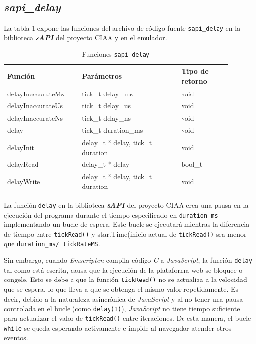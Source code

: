 \subsection{\textit{\textbf{sapi\_delay}}}

La tabla \ref{tab:sapiDelay} expone las funciones del archivo de código fuente \texttt{sapi\_delay} en la biblioteca \textit{\textbf{sAPI}} del proyecto CIAA y en el emulador.

\begin{table}[h]
	\centering
	\caption[Funciones \texttt{sapi\_delay}]{Funciones \texttt{sapi\_delay}}
	\begin{tabular}{p{0.30\linewidth} p{0.40\linewidth}  p{0.20\linewidth}}    
		\toprule
		\textbf{Función} 	 & \textbf{Parámetros} 		& \textbf{Tipo de retorno}  \\
		\midrule
		delayInaccurateMs & tick\_t delay\_ms 		&  void \\		
		delayInaccurateUs	 & tick\_t delay\_us			&  void \\
		delayInaccurateNs	 & tick\_t delay\_ns				& void \\
		delay	 & tick\_t duration\_ms				&  void \\
		delayInit & delay\_t * delay, tick\_t duration 		&  void \\
		delayRead & delay\_t * delay 		&  bool\_t \\
		delayWrite & delay\_t * delay, tick\_t duration 		&  void \\	
		\bottomrule
		\hline
	\end{tabular}
	\label{tab:sapiDelay}
\end{table}

La función \texttt{delay} en la biblioteca \textit{\textbf{sAPI}} del proyecto CIAA crea una pausa en la ejecución del programa durante el tiempo especificado en \texttt{duration\_ms} implementando un bucle de espera. Este bucle se ejecutará mientras la diferencia de tiempo entre \texttt{tickRead()} y startTime(inicio actual de \texttt{tickRead()} sea menor que \texttt{duration\_ms/ tickRateMS}.

Sin embargo, cuando \textit{Emscripten} compila código \textit{C} a \textit{JavaScript}, la función \texttt{delay} tal como está escrita, causa que la ejecución de la plataforma web se bloquee o congele. Esto se debe a que la función \texttt{tickRead()} no se actualiza a la velocidad que se espera, lo que lleva a que se obtenga el mismo valor repetidamente. Es decir, debido a la naturaleza asincrónica de \textit{JavaScript} y al no tener una pausa controlada en el bucle (como \texttt{delay(1)}), \textit{JavaScript} no tiene tiempo suficiente para actualizar el valor de \texttt{tickRead()} entre iteraciones. De esta manera,  el bucle \texttt{while} se queda esperando activamente e impide al navegador atender otros eventos.

